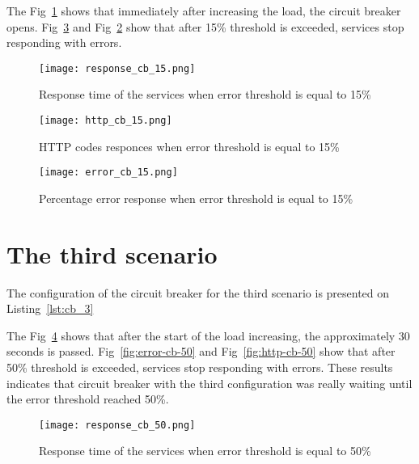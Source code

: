 The Fig~\ref{fig:response-cb-15} shows that immediately after increasing the load, the circuit breaker opens.
Fig~\ref{fig:error-cb-15} and Fig~\ref{fig:http-cb-15} show that after 15\% threshold is exceeded, services stop responding with errors.

\begin{figure}[t]
    \centering
    \texttt{[image: response\_cb\_15.png]}
    \caption{Response time of the services when error threshold is equal to 15\%}
    \label{fig:response-cb-15}
\end{figure}
\begin{figure}[t]
    \centering
    \texttt{[image: http\_cb\_15.png]}
    \caption{HTTP codes responces when error threshold is equal to 15\%}
    \label{fig:http-cb-15}
\end{figure}
\begin{figure}[t]
    \centering
    \texttt{[image: error\_cb\_15.png]}
    \caption{Percentage error response when error threshold is equal to 15\%}
    \label{fig:error-cb-15}
\end{figure}

\section{The third scenario}\label{sec:test_description_3}
The configuration of the circuit breaker for the third scenario is presented on Listing~\ref{lst:cb_3}
\begin{minipage}{\textwidth}

\end{minipage}

The Fig~\ref{fig:response-cb-50} shows that after the start of the load increasing, the approximately 30 seconds is passed.
Fig~\ref{fig:error-cb-50} and Fig~\ref{fig:http-cb-50} show that after 50\% threshold is exceeded, services stop responding with errors. These results indicates that circuit breaker with the third configuration was really waiting until the error threshold reached 50\%.
\begin{figure}[t]
    \centering
    \texttt{[image: response\_cb\_50.png]}
    \caption{Response time of the services when error threshold is equal to 50\%}
    \label{fig:response-cb-50}
\end{figure}

